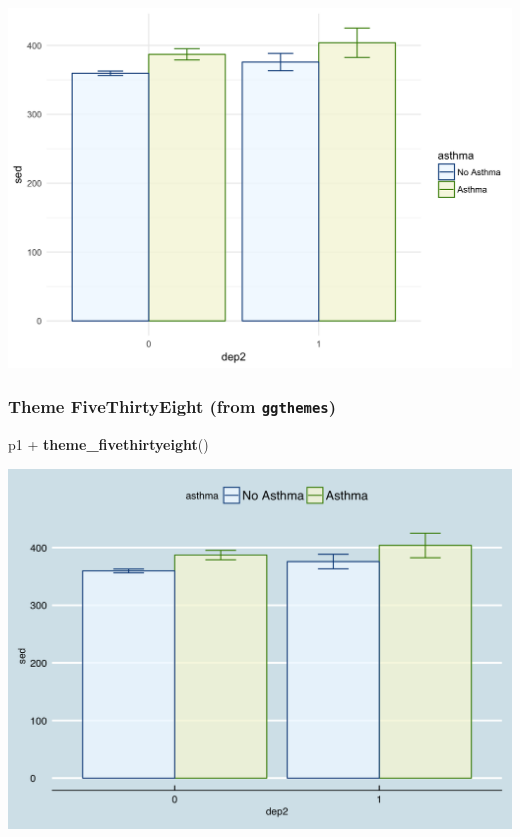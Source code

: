 \documentclass[]{tufte-book}
\newenvironment{Shaded}{}{}
\newcommand{\KeywordTok}[1]{\textcolor[rgb]{0.00,0.44,0.13}{\textbf{#1}}}
\newcommand{\StringTok}[1]{\textcolor[rgb]{0.25,0.44,0.63}{#1}}
\newcommand{\OperatorTok}[1]{\textcolor[rgb]{0.40,0.40,0.40}{#1}}
\newcommand{\NormalTok}[1]{#1}
\theoremstyle{definition}
\theoremstyle{definition}
\theoremstyle{remark}
\begin{document}
\includegraphics{_main_files/figure-latex/unnamed-chunk-149-1}

\subsubsection*{\texorpdfstring{Theme FiveThirtyEight (from
\texttt{ggthemes})}{Theme FiveThirtyEight (from ggthemes)}}\label{theme-fivethirtyeight-from-ggthemes}

\begin{Shaded}
\begin{Highlighting}[]
\NormalTok{p1 }\OperatorTok{+}\StringTok{ }\KeywordTok{theme_fivethirtyeight}\NormalTok{()}
\end{Highlighting}
\end{Shaded}

\includegraphics{_main_files/figure-latex/unnamed-chunk-150-1}
\end{document}
